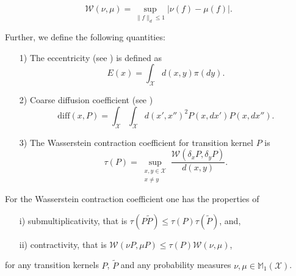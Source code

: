 \begin{theorem}
\label{thm:kantorovich_rubenstein_duality}
\[
\mathcal{W}(\nu, \mu) = \sup_{ \| f \|_d \leq 1} \left\vert \nu(f) - \mu(f) \right\vert.
\]
\end{theorem}

Further, we define the following quantities: 
\begin{itemize}
\item[1)] The eccentricity (see \cite{joulin2010curvature}) is defined as 
\[
E(x) = \int_{\mathcal{X}} d(x, y) \pi(dy).
\] 
\item[2)] Coarse diffusion coefficient (see \cite{joulin2010curvature})
\[
\mathrm{diff}(x, P) = \int_{\mathcal{X}} \int_{\mathcal{X}} d(x', x'')^2 P(x, dx') P(x, dx'').
\]
\item[3)] The Wasserstein contraction coefficient  for transition kernel $P$ is 
\[
\tau(P) = \sup_{\substack{x, y \in \mathcal{X} \\ x \neq y}} \frac{\mathcal{W} (\delta_x P, \delta_y P)}{d(x, y)}.
\]
\end{itemize}

\begin{proposition}
 For the Wasserstein contraction coefficient one has the properties of
\begin{itemize}
\item[i)] submultiplicativity, that is $\tau(P \tilde{P} ) \leq \tau(P) \tau(\tilde{P})$, and,
\item[ii)] contractivity, that is $\mathcal{W}(\nu P , \mu P) \leq \tau(P) \mathcal{W}(\nu, \mu)$,
\end{itemize}
for any transition kernels $P$, $\tilde{P}$ and any probability measures $\nu, \mu \in \mathbb{M}_1(\mathcal{X})$.  
\end{proposition}